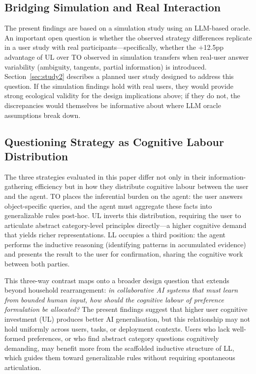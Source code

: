 \documentclass[manuscript,review,anonymous]{acmart}
\begin{document}
{\subsection{Bridging Simulation and Real Interaction}

The present findings are based on a simulation study using an LLM-based oracle. An important open question is whether the observed strategy differences replicate in a user study with real participants---specifically, whether the $+$12.5pp advantage of UL over TO observed in simulation transfers when real-user answer variability (ambiguity, tangents, partial information) is introduced. Section~\ref{sec:study2} describes a planned user study designed to address this question. If the simulation findings hold with real users, they would provide strong ecological validity for the design implications above; if they do not, the discrepancies would themselves be informative about where LLM oracle assumptions break down.

\subsection{Questioning Strategy as Cognitive Labour Distribution}
\label{sec:discussion:labour}

The three strategies evaluated in this paper differ not only in their information-gathering efficiency but in how they distribute cognitive labour between the user and the agent. TO places the inferential burden on the agent: the user answers object-specific queries, and the agent must aggregate these facts into generalizable rules post-hoc. UL inverts this distribution, requiring the user to articulate abstract category-level principles directly---a higher cognitive demand that yields richer representations. LL occupies a third position: the agent performs the inductive reasoning (identifying patterns in accumulated evidence) and presents the result to the user for confirmation, sharing the cognitive work between both parties.

This three-way contrast maps onto a broader design question that extends beyond household rearrangement: \textit{in collaborative AI systems that must learn from bounded human input, how should the cognitive labour of preference formulation be allocated?} The present findings suggest that higher user cognitive investment (UL) produces better AI generalisation, but this relationship may not hold uniformly across users, tasks, or deployment contexts. Users who lack well-formed preferences, or who find abstract category questions cognitively demanding, may benefit more from the scaffolded inductive structure of LL, which guides them toward generalizable rules without requiring spontaneous articulation.

}
\end{document}
